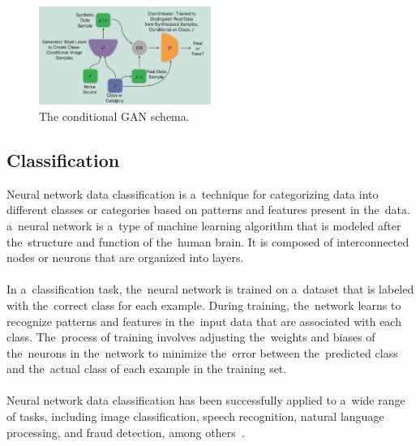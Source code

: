     \begin{center}
        \begin{figure}[!ht]
            \centering
            \includegraphics[width=0.5\textwidth]{figures/gan}
            \caption{The conditional GAN schema. \cite{creswell2018generative}}
            \label{fig:gan}
        \end{figure}
    \end{center}
    
    \subsection{Classification} \label{subsec:clasification}
    Neural network data classification is a~technique for categorizing data into different classes or categories based on patterns and features present in the~data. a~neural network is a~type of machine learning algorithm that is modeled after the~structure and function of the~human brain. It is composed of interconnected nodes or neurons that are organized into layers.\\
    \\
    In a~classification task, the~neural network is trained on a~dataset that is labeled with the~correct
class for each example. During training, the~network learns to recognize patterns and features in the~input data
that are associated with each class. The~process of training involves adjusting the~weights and biases of the~neurons in the~network to minimize the~error between the~predicted class and the~actual class of each example in the training set.\\
    \\
    Neural network data classification has been successfully applied to a~wide range of tasks, including image
classification, speech recognition, natural language processing, and fraud detection, among others~\cite{feraud2002methodology}.

